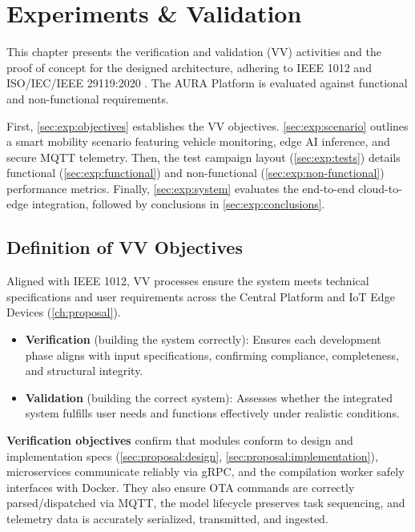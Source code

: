 \chapter{Experiments \& Validation}\label{ch:experiments}

This chapter presents the verification and validation (\gls{VV}) activities and the proof of concept for the designed architecture, adhering to \acrshort{IEEE} 1012 \cite{IEEEStandardSystem} and \acrshort{ISO}/\acrshort{IEC}/\acrshort{IEEE} 29119:2020 \cite{ISOIECIEEEa}\cite{ISOIECIEEE}\cite{IEEEISOIECa}\cite{IEEEISOIEC}. The \gls{AURA} Platform is evaluated against functional and non-functional requirements.

First, \autoref{sec:exp:objectives} establishes the \gls{VV} objectives. \autoref{sec:exp:scenario} outlines a smart mobility scenario featuring vehicle monitoring, edge \gls{AI} inference, and secure \gls{MQTT} telemetry. Then, the test campaign layout (\autoref{sec:exp:tests}) details functional (\autoref{sec:exp:functional}) and non-functional (\autoref{sec:exp:non-functional}) performance metrics. Finally, \autoref{sec:exp:system} evaluates the end-to-end cloud-to-edge integration, followed by conclusions in \autoref{sec:exp:conclusions}.


\section{Definition of \texorpdfstring{\acrfull{VV}}{VV} Objectives}\label{sec:exp:objectives}

Aligned with \gls{IEEE} 1012, \gls{VV} processes ensure the system meets technical specifications and user requirements across the Central Platform and \gls{IoT} Edge Devices (\autoref{ch:proposal}).

\begin{itemize}
    \item \textbf{Verification} (building the system correctly): Ensures each development phase aligns with input specifications, confirming compliance, completeness, and structural integrity.
    \item \textbf{Validation} (building the correct system): Assesses whether the integrated system fulfills user needs and functions effectively under realistic conditions.
\end{itemize}

\textbf{Verification objectives} confirm that modules conform to design and implementation specs (\autoref{sec:proposal:design}, \autoref{sec:proposal:implementation}), microservices communicate reliably via \gls{gRPC}, and the compilation worker safely interfaces with Docker. They also ensure \gls{OTA} commands are correctly parsed/dispatched via \gls{MQTT}, the model lifecycle preserves task sequencing, and telemetry data is accurately serialized, transmitted, and ingested.

